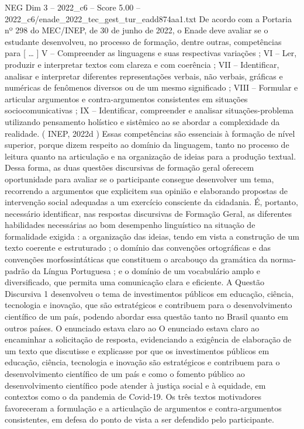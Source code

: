 \begin{textsample}{NEG Dim 3 – 2022\_c6 – Score 5.00 – 2022\_c6/enade\_2022\_tec\_gest\_tur\_eadd874aa1.txt}
De acordo com a Portaria nº 298 do MEC/INEP, de 30 de junho de 2022, o Enade deve avaliar se o estudante desenvolveu, no processo de formação, dentre outras, competências para [ … ] V – Compreender as linguagens e suas respectivas variações ; VI – Ler, produzir e interpretar textos com clareza e com coerência ; VII – Identificar, analisar e interpretar diferentes representações verbais, não verbais, gráficas e numéricas de fenômenos diversos ou de um mesmo significado ; VIII – Formular e articular argumentos e contra-argumentos consistentes em situações sociocomunicativas ; IX – Identificar, compreender e analisar situações-problema utilizando pensamento holístico e sistêmico ao se abordar a complexidade da realidade. ( INEP, 2022d ) Essas competências são essenciais à formação de nível superior, porque dizem respeito ao domínio da linguagem, tanto no processo de leitura quanto na articulação e na organização de ideias para a produção textual.
Dessa forma, as duas questões discursivas de formação geral oferecem oportunidade para avaliar se o participante consegue desenvolver um tema, recorrendo a argumentos que explicitem sua opinião e elaborando propostas de intervenção social adequadas a um exercício consciente da cidadania.
É, portanto, necessário identificar, nas respostas discursivas de Formação Geral, as diferentes habilidades necessárias ao bom desempenho linguístico na situação de formalidade exigida : a organização das ideias, tendo em vista a construção de um texto coerente e estruturado ; o domínio das convenções ortográficas e das convenções morfossintáticas que constituem o arcabouço da gramática da norma-padrão da Língua Portuguesa ; e o domínio de um vocabulário amplo e diversificado, que permita uma comunicação clara e eficiente.
A Questão Discursiva 1 desenvolveu o tema de investimentos públicos em educação, ciência, tecnologia e inovação, que são estratégicos e contribuem para o desenvolvimento científico de um país, podendo abordar essa questão tanto no Brasil quanto em outros países.
O enunciado estava claro ao O enunciado estava claro ao encaminhar a solicitação de resposta, evidenciando a exigência de elaboração de um texto que discutisse e explicasse por que os investimentos públicos em educação, ciência, tecnologia e inovação são estratégicos e contribuem para o desenvolvimento científico de um país e como o fomento público ao desenvolvimento científico pode atender à justiça social e à equidade, em contextos como o da pandemia de Covid-19.
Os três textos motivadores favoreceram a formulação e a articulação de argumentos e contra-argumentos consistentes, em defesa do ponto de vista a ser defendido pelo participante.

\end{textsample}
